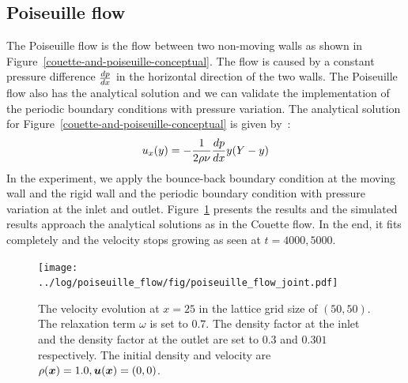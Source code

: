 \subsection{Poiseuille flow}
The Poiseuille flow is the flow between two non-moving walls as shown in Figure~\ref{couette-and-poiseuille-conceptual}.
The flow is caused by a constant pressure difference $\frac{d p}{d x}$
in the horizontal direction of the two walls.
The Poiseuille flow also has the analytical solution
and we can validate the implementation of the periodic boundary conditions
with pressure variation.
The analytical solution for Figure~\ref{couette-and-poiseuille-conceptual} is given by~\cite{mendiburu2009analytical}:
\begin{equation}
\begin{aligned}
  u_x(y) = - \frac{1}{2\rho \nu} \frac{d p}{d x} y (Y - y)
\end{aligned}
\end{equation}
In the experiment, we apply the bounce-back boundary condition
at the moving wall and the rigid wall
and the periodic boundary condition with pressure variation at the inlet and outlet.
Figure~\ref{fig:poiseuille-velocity-evolution} presents the results
and the simulated results approach the analytical solutions as in the Couette flow.
In the end, it fits completely
and the velocity stops growing as seen at $t=4000, 5000$.

\begin{figure}[H]
  \centering
  \texttt{[image: ../log/poiseuille\_flow/fig/poiseuille\_flow\_joint.pdf]}
  \caption{The velocity evolution at
  $x = 25$ in the lattice grid size of $(50, 50)$.
  The relaxation term $\omega$ is set to $0.7$.
  The density factor at the inlet and the density factor
  at the outlet are set to $0.3$ and $0.301$ respectively.
  The initial density and velocity are $\rho(\boldsymbol{x}) = 1.0, \boldsymbol{u}(\boldsymbol{x}) = (0, 0)$.
  \label{fig:poiseuille-velocity-evolution}}
\end{figure}

